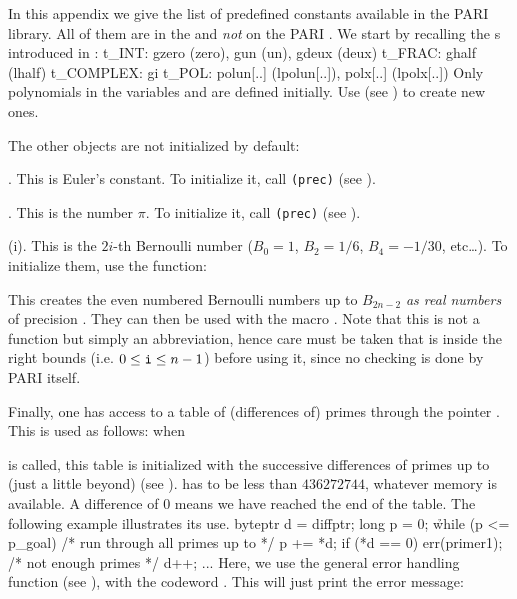 
In this appendix we give the list of predefined constants available in the
PARI library. All of them are in the  and {\it not\/} on the PARI
. We start by recalling the s introduced in
:
%
\bprog%
t\_INT: gzero (zero), gun (un), gdeux (deux)
t\_FRAC: ghalf (lhalf)
t\_COMPLEX: gi
t\_POL: polun[..] (lpolun[..]), polx[..] (lpolx[..])
\eprog
\noindent Only polynomials in the variables  and  are
defined initially. Use  (see ) to
create new ones.

\noindent The other objects are not initialized by default:

. This is Euler's constant. To initialize it, call
{\tt{}(prec)} (see ).

. This is the number $\pi$. To initialize it, call
{\tt{}(prec)} (see ).

(i). This is the $2i$-th Bernoulli number ($B_0=1$, $B_2=1/6$,
$B_4=-1/30$, etc\dots). To initialize them, use the function:


This creates the even numbered Bernoulli numbers up to $B_{2n-2}$ {\it as
real numbers\/} of precision . They can then be used with the macro
. Note that this is not a function but simply an abbreviation,
hence care must be taken that  is inside the right bounds (i.e. $0\le
{\tt i}\le n-1$) before using it, since no checking is done by PARI itself.

Finally, one has access to a table of (differences of) primes through the
pointer . This is used as follows: when


\noindent is called, this table is initialized with the successive
differences of primes up to (just a little beyond) 
(see ).  has to be less than $436272744$,
whatever memory is available. A
difference of $0$ means we have reached the end of the table. The following
example illustrates its use.
%
\bprog%
byteptr d = diffptr;
long p = 0;
\h
while (p <= p\_goal) /* {\rm run through all primes up to } */
\obr
  p += *d;
  if (*d == 0) err(primer1); /* {\rm not enough primes} */
  d++;
  ...
\cbr
\eprog\noindent
Here, we use the general error handling function  (see
), with the codeword . This will just print
the error message:

